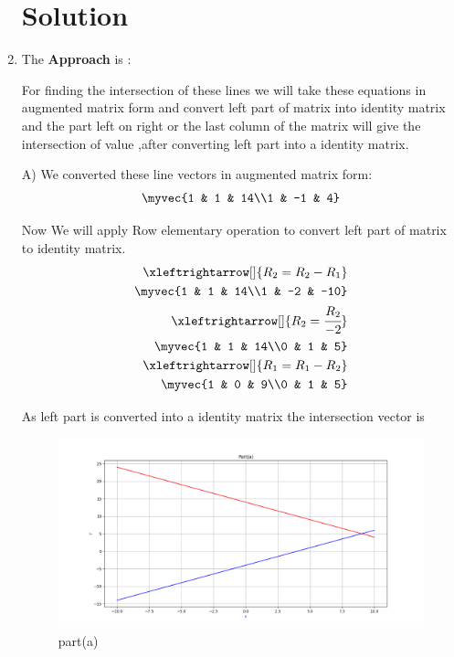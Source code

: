 \begin{enumerate}[label=\thesection.\arabic*.,ref=\thesection.\theenumi]
\section{Solution}

\item The \textbf{Approach} is :
\begin{flushleft}
    For finding the intersection of these lines we will take these equations in augmented matrix form and convert left part of matrix into identity matrix and the part left on right or the last column of the matrix will give the intersection of value ,after converting left part into a identity matrix.\\
\end{flushleft}

A)
We converted these line vectors in augmented matrix form:\\ 

\begin{align*}
    \myvec{1 & 1 & 14\\1 & -1 & 4}\\
\end{align*} 

Now We will apply Row elementary operation to convert left part of matrix to identity matrix.\\

\begin{align*}
    \xleftrightarrow[]{R_{2}=R_{2}-R_{1}}
\\
    \myvec{1 & 1 & 14\\1 & -2 & -10}
\\
    \xleftrightarrow[]{R_{2}=\cfrac{R_{2}}{-2}}
\\
    \myvec{1 & 1 & 14\\0 & 1 & 5}
\\
    \xleftrightarrow[]{R_{1}=R_{1}-R_{2}}
\\
    \myvec{1 & 0 & 9\\0 & 1 & 5}
\end{align*}

As left part is converted into a identity matrix the intersection vector is \\
    
\renewcommand{\thefigure}{\theenumi.\arabic{figure}}
\begin{figure}[!ht]
    \centering
    \includegraphics[width=\columnwidth]{./figures/A1_parta}
\caption{part(a)}
\label{fig: part(a)}
\end{figure}


\end{enumerate}
